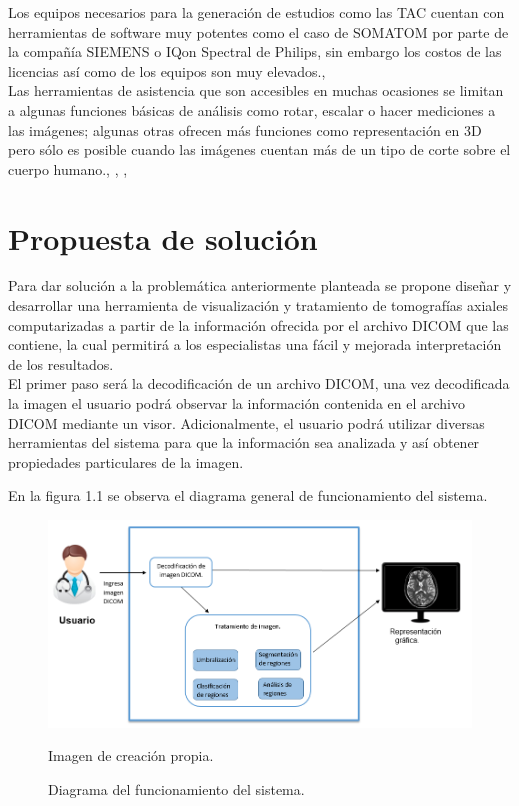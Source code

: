 \documentclass[12pt]{report}
\begin{document}
Los equipos necesarios para la generación de estudios como las TAC cuentan con herramientas de software muy potentes como el caso de SOMATOM por parte de la compañía SIEMENS o IQon Spectral de Philips, sin embargo los costos de las licencias así como de los equipos son muy elevados.\cite{guia}, \cite{guiad}\\

Las herramientas de asistencia que son accesibles en muchas ocasiones se limitan a algunas funciones básicas de análisis como rotar, escalar o hacer mediciones a las imágenes; algunas otras ofrecen más funciones como representación en 3D pero sólo es posible cuando las imágenes  cuentan más de un tipo de corte sobre el cuerpo humano.\cite{occi}, \cite{nifty}, \cite{osirix}, \cite{3dim}\\

\section{Propuesta de solución}
Para dar solución a la problemática anteriormente planteada se propone diseñar y desarrollar una herramienta de visualización y tratamiento de tomografías axiales computarizadas a partir de la información ofrecida por el archivo DICOM que las contiene, la cual permitirá a los especialistas una fácil y mejorada interpretación de  los resultados.\\

El primer paso será la decodificación de un archivo DICOM, una vez decodificada la imagen el usuario podrá observar la información contenida en el archivo DICOM mediante un visor. Adicionalmente, el usuario podrá utilizar diversas herramientas del sistema para que la información sea analizada y así obtener propiedades particulares de la imagen.

En la figura 1.1 se observa el diagrama general de funcionamiento del sistema.
\begin{figure}[H]
\centering
\includegraphics[width = 12 cm, height = 7 cm]{diagramageneral}
\caption{Diagrama del funcionamiento del sistema.}
Imagen de creación propia.
\end{figure}
\end{document}
